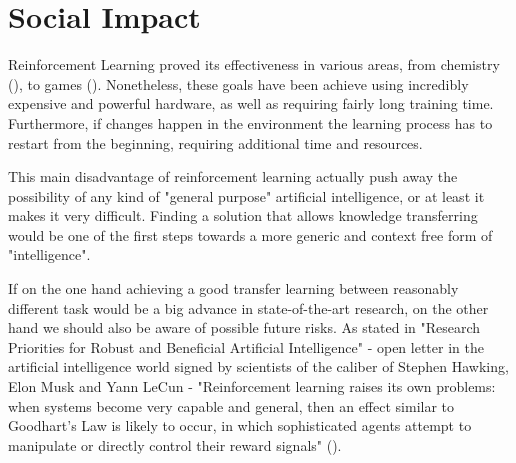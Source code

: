 \section{Social Impact}

Reinforcement Learning proved its effectiveness in various areas, from chemistry (\cite{zhou2017optimizing}), to games (\cite{silver2017mastering}).
Nonetheless, these goals have been achieve using incredibly expensive and powerful hardware, as well as requiring fairly long training time.
Furthermore, if changes happen in the environment the learning process has to restart from the beginning, requiring additional time and resources. 

This main disadvantage of reinforcement learning actually push away the possibility of any kind of "general purpose" artificial intelligence, or at least it makes it very difficult. Finding a solution that allows knowledge transferring would be one of the first steps towards a more generic and context free form of "intelligence". 

If on the one hand achieving a good transfer learning between reasonably different task would be a big advance in state-of-the-art research, on the other hand we should also be aware of possible future risks.
As stated in "Research Priorities for
Robust and Beneficial Artificial Intelligence" - open letter in the artificial intelligence world signed by scientists of the caliber of Stephen Hawking, Elon Musk and Yann LeCun - "Reinforcement learning raises its
own problems: when systems become very capable and general, then an effect similar to Goodhart’s Law is likely to occur, in which sophisticated agents
attempt to manipulate or directly control their reward
signals" (\cite{russell2016research}). %
